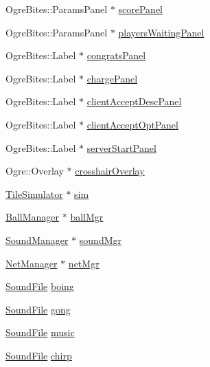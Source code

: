 \begin{DoxyCompactItemize}
\item 
Ogre\-Bites\-::\-Params\-Panel $\ast$ \hyperlink{classTileGame_a9a4d1b4dfacca55fdeacf454af04fa0c}{score\-Panel}
\item 
Ogre\-Bites\-::\-Params\-Panel $\ast$ \hyperlink{classTileGame_a6ec622cd0062396ffa3e929702fc870d}{players\-Waiting\-Panel}
\item 
Ogre\-Bites\-::\-Label $\ast$ \hyperlink{classTileGame_a5e8deb9eb2903e1787a28699a9e6f346}{congrats\-Panel}
\item 
Ogre\-Bites\-::\-Label $\ast$ \hyperlink{classTileGame_ab63beac85c1df6056bd1a097e43cea34}{charge\-Panel}
\item 
Ogre\-Bites\-::\-Label $\ast$ \hyperlink{classTileGame_a0b1acda06716401a6a6a1936d111e187}{client\-Accept\-Desc\-Panel}
\item 
Ogre\-Bites\-::\-Label $\ast$ \hyperlink{classTileGame_ab768d0250251800d81ff2d85d1c2c324}{client\-Accept\-Opt\-Panel}
\item 
Ogre\-Bites\-::\-Label $\ast$ \hyperlink{classTileGame_a788abd4a926b8492ba5db8f4d87a41a7}{server\-Start\-Panel}
\item 
Ogre\-::\-Overlay $\ast$ \hyperlink{classTileGame_a11747d7250c1ef16b13a14a84edbfbaf}{crosshair\-Overlay}
\item 
\hyperlink{classTileSimulator}{Tile\-Simulator} $\ast$ \hyperlink{classTileGame_a2225cb84303358e59c6093b8a999e085}{sim}
\item 
\hyperlink{classBallManager}{Ball\-Manager} $\ast$ \hyperlink{classTileGame_a7fe1ce6963e7ac2bd5022e653368c0ed}{ball\-Mgr}
\item 
\hyperlink{classSoundManager}{Sound\-Manager} $\ast$ \hyperlink{classTileGame_aca4c76a09f77a7f55ae0c4396f72aefc}{sound\-Mgr}
\item 
\hyperlink{classNetManager}{Net\-Manager} $\ast$ \hyperlink{classTileGame_a691f85c8b3c30335e6b8f6f83a8910ad}{net\-Mgr}
\item 
\hyperlink{SoundManager_8h_a05cf79926d9921eb07e70e460b021307}{Sound\-File} \hyperlink{classTileGame_a796c40847db5cd687417574064fbd90d}{boing}
\item 
\hyperlink{SoundManager_8h_a05cf79926d9921eb07e70e460b021307}{Sound\-File} \hyperlink{classTileGame_a6912a91d6b7eb2e88033d8571e3daecb}{gong}
\item 
\hyperlink{SoundManager_8h_a05cf79926d9921eb07e70e460b021307}{Sound\-File} \hyperlink{classTileGame_a6622c980107331b95697d74839dde768}{music}
\item 
\hyperlink{SoundManager_8h_a05cf79926d9921eb07e70e460b021307}{Sound\-File} \hyperlink{classTileGame_a24c9cc7591c2ff3ffc6a50b64453c181}{chirp}

\end{DoxyCompactItemize}
